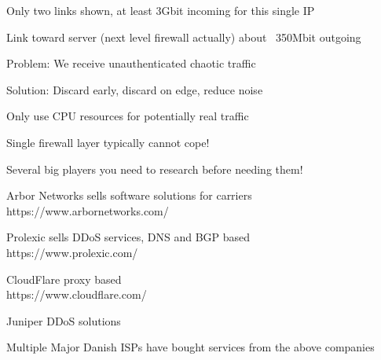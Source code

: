 \documentclass[20pt,landscape,a4paper,footrule]{foils}
\begin{document}
\centerline{Only two links shown, at least 3Gbit incoming for this single IP}

\centerline{Link toward server (next level firewall actually) about ~350Mbit outgoing}

\begin{list1}
\item Problem: We receive unauthenticated chaotic traffic

\item Solution: Discard early, discard on edge, reduce noise

\item Only use CPU resources for potentially real traffic
\end{list1}

\centerline{Single firewall layer typically cannot cope!}





\begin{list1}
\item Several big players you need to research before needing them!
\item Arbor Networks sells software solutions for carriers\\
https://www.arbornetworks.com/

\item Prolexic sells DDoS services, DNS and BGP based\\
https://www.prolexic.com/

\item CloudFlare proxy based\\
https://www.cloudflare.com/

\item Juniper DDoS solutions
\end{list1}


\vskip 2cm
\centerline{Multiple Major Danish ISPs have bought services from the above companies}



\end{document}
